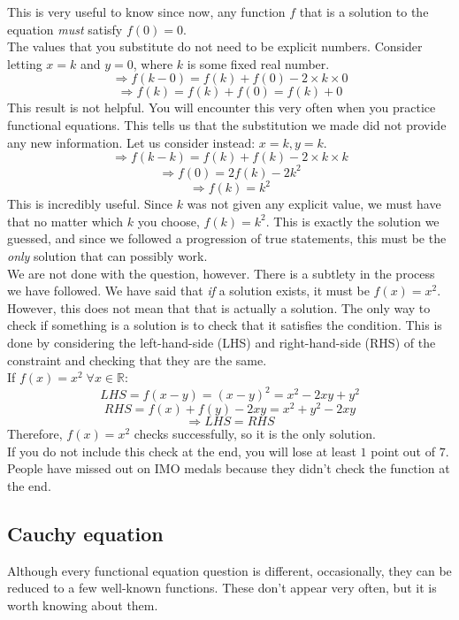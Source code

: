 \documentclass[a4paper,12pt]{article}
\begin{document}
This is very useful to know since now, any function $f$ that is a solution to the equation \emph{must} satisfy $f(0) = 0$. \\

The values that you substitute do not need to be explicit numbers. Consider letting $x = k$ and $y = 0$, where $k$ is some fixed real number.
$$\Rightarrow f(k - 0) = f(k) + f(0) - 2 \times k \times 0$$
$$\Rightarrow f(k) = f(k) + f(0) = f(k) + 0$$
This result is not helpful. You will encounter this very often when you practice functional equations. This tells us that the substitution we made did not provide any new information. Let us consider instead: $x = k, y = k$.
$$\Rightarrow f(k - k) = f(k) + f(k) - 2 \times k \times k$$
$$\Rightarrow f(0) = 2f(k) - 2k^2$$
$$\Rightarrow f(k) = k^2$$
This is incredibly useful. Since $k$ was not given any explicit value, we must have that no matter which $k$ you choose, $f(k) = k^2$. This is exactly the solution we guessed, and since we followed a progression of true statements, this must be the \emph{only} solution that can possibly work. \\

We are not done with the question, however. There is a subtlety in the process we have followed. We have said that \emph{if} a solution exists, it must be $f(x) = x^2$. However, this does not mean that that is actually a solution.
The only way to check if something is a solution is to check that it satisfies the condition. This is done by considering the left-hand-side (LHS) and right-hand-side (RHS) of the constraint and checking that they are the same.\\

If $f(x) = x^2 \; \forall x \in \mathbb{R}$:
$$LHS = f(x - y) = (x - y)^2 = x^2 - 2xy + y^2$$
$$RHS = f(x) + f(y) - 2xy = x^2 + y^2 - 2xy$$
$$\Rightarrow LHS = RHS $$
Therefore, $f(x) = x^2$ checks successfully, so it is the only solution.\\
If you do not include this check at the end, you will lose at least $1$ point out of $7$. People have missed out on IMO medals because they didn't check the function at the end.\\

\subsection{Cauchy equation}
Although every functional equation question is different, occasionally, they can be reduced to a few well-known functions. These don't appear very often, but it is worth knowing about them.\\
\end{document}
